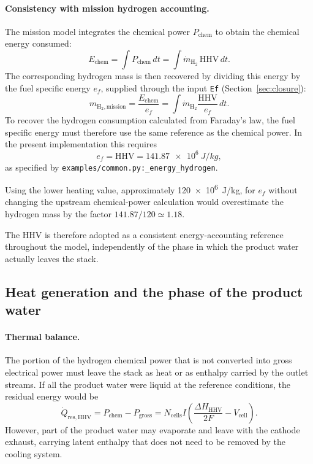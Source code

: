 \documentclass[a4paper,11pt]{article}
\newcommand{\code}[1]{\nolinkurl{#1}}
\newcommand{\fn}[1]{\nolinkurl{#1}}
\begin{document}
\paragraph{Consistency with mission hydrogen accounting.}
The mission model integrates the chemical power $P_\mathrm{chem}$
to obtain the chemical energy consumed:
\begin{equation}
  E_\mathrm{chem} = \int P_\mathrm{chem}\,dt
  = \int \dot m_{\mathrm{H_2}}\,\mathrm{HHV}\,dt.
\end{equation}
The corresponding hydrogen mass is then recovered by dividing this
energy by the fuel specific energy $e_f$, supplied through the input
\code{Ef} (Section~\ref{sec:closure}):
\begin{equation}
  m_{\mathrm{H_2,mission}}
  = \frac{E_\mathrm{chem}}{e_f}
  = \int \dot m_{\mathrm{H_2}}
    \frac{\mathrm{HHV}}{e_f}\,dt.
\end{equation}
To recover the hydrogen consumption calculated from Faraday's law,
the fuel specific energy must therefore use the same reference as
the chemical power. In the present implementation this requires
\begin{equation}
  e_f = \mathrm{HHV} = \SI{141.87e6}{J/kg},
\end{equation}
as specified by \fn{examples/common.py:_energy_hydrogen}.

Using the lower heating value, approximately \SI{120e6}{J/kg},
for $e_f$ without changing the upstream chemical-power calculation
would overestimate the hydrogen mass by the factor
$141.87/120 \simeq 1.18$.

The HHV is therefore adopted as a consistent energy-accounting
reference throughout the model, independently of the phase in which
the product water actually leaves the stack.


\subsection{Heat generation and the phase of the product water}
\label{sec:heat}

\paragraph{Thermal balance.}
The portion of the hydrogen chemical power that is not converted
into gross electrical power must leave the stack as heat or as
enthalpy carried by the outlet streams. If all the product water
were liquid at the reference conditions, the residual energy
would be
\begin{equation}
  \dot Q_\mathrm{res,HHV}
  = P_\mathrm{chem} - P_\mathrm{gross}
  = N_\mathrm{cells} I
    \left(\frac{\Delta H_\mathrm{HHV}}{2F}-V_\mathrm{cell}\right).
\end{equation}
However, part of the product water may evaporate and leave with
the cathode exhaust, carrying latent enthalpy that does not need
to be removed by the cooling system.
\end{document}
